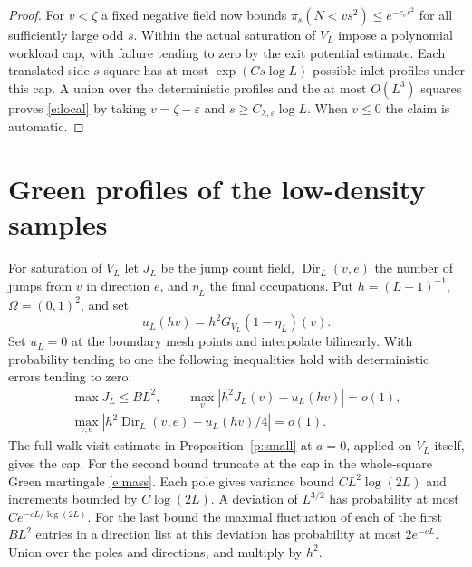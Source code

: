 \documentclass[11pt]{amsart}
\newcommand{\1}{\mathbf 1}
\begin{document}
\begin{proof}
For \(v<\zeta\) a fixed negative field now bounds \(\pi_s(N<v s^2)\le e^{-c_v s^2}\) for all sufficiently large odd \(s\). Within the actual saturation of \(V_L\) impose a polynomial workload cap, with failure tending to zero by the exit potential estimate. Each translated side-\(s\) square has at most \(\exp(Cs\log L)\) possible inlet profiles under this cap. A union over the deterministic profiles and the at most \(O(L^3)\) squares proves \eqref{e:local} by taking \(v=\zeta-\varepsilon\) and \(s\ge C_{\lambda,\varepsilon}\log L\). When \(v\le0\) the claim is automatic.
\end{proof}

\section{Green profiles of the low-density samples}\label{s:profiles}

For saturation of \(V_L\) let \(J_L\) be the jump count field, \(\operatorname{Dir}_L(v,e)\) the number of jumps from \(v\) in direction \(e\), and \(\eta_L\) the final occupations. Put \(h=(L+1)^{-1}\), \(\Omega=(0,1)^2\), and set
\[
 u_L(hv)=h^2G_{V_L}(1-\eta_L)(v).
\]
Set \(u_L=0\) at the boundary mesh points and interpolate bilinearly. With probability tending to one the following inequalities hold with deterministic errors tending to zero:
\begin{equation}\label{e:field}
 \begin{gathered}
 \max J_L\le B L^2,\qquad \max_v |h^2J_L(v)-u_L(hv)|=o(1),\\
 \max_{v,e}|h^2\operatorname{Dir}_L(v,e)-u_L(hv)/4|=o(1).
 \end{gathered}
\end{equation}
The full walk visit estimate in Proposition~\ref{p:small} at \(a=0\), applied on \(V_L\) itself, gives the cap. For the second bound truncate at the cap in the whole-square Green martingale \eqref{e:mass}. Each pole gives variance bound \(CL^2\log(2L)\) and increments bounded by \(C\log(2L)\). A deviation of \(L^{3/2}\) has probability at most \(C e^{-c L/\log(2L)}\). For the last bound the maximal fluctuation of each of the first \(BL^2\) entries in a direction list at this deviation has probability at most \(2e^{-cL}\). Union over the poles and directions, and multiply by \(h^2\).
\end{document}
